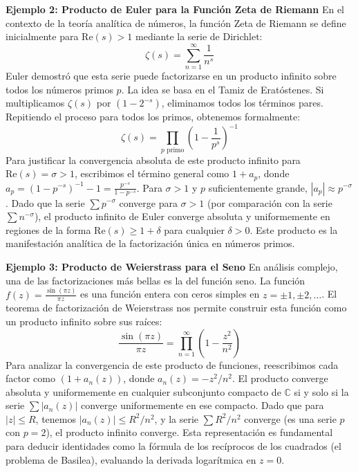 \documentclass[a4paper]{article}
\begin{document}
\textbf{Ejemplo 2: Producto de Euler para la Función Zeta de Riemann}
En el contexto de la teoría analítica de números, la función Zeta de Riemann se define inicialmente para $\text{Re}(s) > 1$ mediante la serie de Dirichlet:
$$ \zeta(s) = \sum_{n=1}^{\infty} \frac{1}{n^s} $$
Euler demostró que esta serie puede factorizarse en un producto infinito sobre todos los números primos $p$. La idea se basa en el Tamiz de Eratóstenes. Si multiplicamos $\zeta(s)$ por $(1 - 2^{-s})$, eliminamos todos los términos pares. Repitiendo el proceso para todos los primos, obtenemos formalmente:
$$ \zeta(s) = \prod_{p \text{ primo}} \left( 1 - \frac{1}{p^s} \right)^{-1} $$
Para justificar la convergencia absoluta de este producto infinito para $\text{Re}(s) = \sigma > 1$, escribimos el término general como $1 + a_p$, donde $a_p = (1 - p^{-s})^{-1} - 1 = \frac{p^{-s}}{1 - p^{-s}}$. 
Para $\sigma > 1$ y $p$ suficientemente grande, $|a_p| \approx p^{-\sigma}$. Dado que la serie $\sum p^{-\sigma}$ converge para $\sigma > 1$ (por comparación con la serie $\sum n^{-\sigma}$), el producto infinito de Euler converge absoluta y uniformemente en regiones de la forma $\text{Re}(s) \geq 1 + \delta$ para cualquier $\delta > 0$. Este producto es la manifestación analítica de la factorización única en números primos.

\textbf{Ejemplo 3: Producto de Weierstrass para el Seno}
En análisis complejo, una de las factorizaciones más bellas es la del función seno. La función $f(z) = \frac{\sin(\pi z)}{\pi z}$ es una función entera con ceros simples en $z = \pm 1, \pm 2, \dots$. El teorema de factorización de Weierstrass nos permite construir esta función como un producto infinito sobre sus raíces:
$$ \frac{\sin(\pi z)}{\pi z} = \prod_{n=1}^{\infty} \left( 1 - \frac{z^2}{n^2} \right) $$
Para analizar la convergencia de este producto de funciones, reescribimos cada factor como $(1 + a_n(z))$, donde $a_n(z) = -z^2/n^2$. 
El producto converge absoluta y uniformemente en cualquier subconjunto compacto de $\mathbb{C}$ si y solo si la serie $\sum |a_n(z)|$ converge uniformemente en ese compacto. 
Dado que para $|z| \leq R$, tenemos $|a_n(z)| \leq R^2/n^2$, y la serie $\sum R^2/n^2$ converge (es una serie $p$ con $p=2$), el producto infinito converge. Esta representación es fundamental para deducir identidades como la fórmula de los recíprocos de los cuadrados (el problema de Basilea), evaluando la derivada logarítmica en $z=0$.
\end{document}
